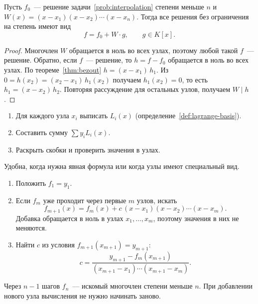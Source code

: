 \documentclass[12pt]{article}
\begin{document}
	\begin{statement}\label{st:interpolation-general}
		Пусть $f_0$~--- решение задачи~\ref{prob:interpolation} степени меньше $n$ и $W(x) = (x - x_1)(x - x_2) \cdots (x - x_n)$. Тогда все решения без ограничения на степень имеют вид
		\[
			f = f_0 + W \cdot g, \qquad g \in K[x].
		\]
	\end{statement}

	\begin{proof}
		Многочлен $W$ обращается в ноль во всех узлах, поэтому любой такой $f$~--- решение. Обратно, если $f$~--- решение, то $h = f - f_0$ обращается в ноль во всех узлах. По теореме~\ref{thm:bezout} $h = (x - x_1)\,h_1$. Из $0 = h(x_2) = (x_2 - x_1)\,h_1(x_2)$ получаем $h_1(x_2) = 0$, то есть $h_1 = (x - x_2)\,h_2$. Повторяя рассуждение для остальных узлов, получаем $W \mid h$.
	\end{proof}

	\begin{method}\label{meth:lagrange}
		\begin{enumerate}
			\item Для каждого узла $x_i$ выписать $L_i(x)$ (определение~\ref{def:lagrange-basis}).
			\item Составить сумму $\sum y_i L_i(x)$.
			\item Раскрыть скобки и проверить значения в узлах.
		\end{enumerate}
		Удобна, когда нужна явная формула или когда узлы имеют специальный вид.
	\end{method}

	\begin{method}\label{meth:newton}
		\begin{enumerate}
			\item Положить $f_1 = y_1$.
			\item Если $f_m$ уже проходит через первые $m$ узлов, искать
			\[
				f_{m+1}(x) = f_m(x) + c\,(x - x_1)(x - x_2) \cdots (x - x_m).
			\]
			Добавка обращается в ноль в узлах $x_1, \dots, x_m$, поэтому значения в них не меняются.
			\item Найти $c$ из условия $f_{m+1}(x_{m+1}) = y_{m+1}$:
			\[
				c = \frac{y_{m+1} - f_m(x_{m+1})}{(x_{m+1} - x_1) \cdots (x_{m+1} - x_m)}.
			\]
		\end{enumerate}
		Через $n - 1$ шагов $f_n$~--- искомый многочлен степени меньше $n$. При добавлении нового узла вычисления не нужно начинать заново.
	\end{method}
\end{document}
